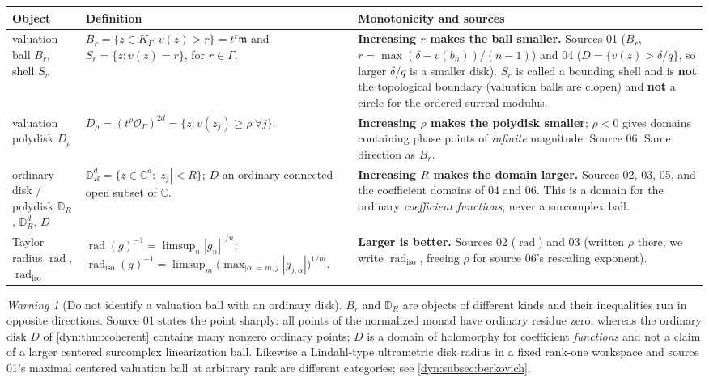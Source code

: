 \documentclass[11pt,letterpaper]{article}
\theoremstyle{definition}
\theoremstyle{remark}
\newtheorem{warning}[warning]{Warning}
\newcommand{\C}{\mathbb C}
\newcommand{\OO}{\mathcal O}
\newcommand{\m}{\mathfrak m}
\newcommand{\rad}{\operatorname{rad}}
\newcommand{\radiso}{\operatorname{rad}_{\mathrm{iso}}}
\numberwithin{equation}{section}
\begin{document}
\begin{longtable}{@{}P{0.16\textwidth}P{0.37\textwidth}P{0.40\textwidth}@{}}
\toprule
Object & Definition & Monotonicity and sources\\
\midrule
\endhead
valuation ball $B_{r}$, shell $S_{r}$
&
$B_{r}=\{z\in K_\Gamma:v(z)>r\}=t^{r}\m$ and
$S_{r}=\{z:v(z)=r\}$, for $r\in\Gamma$.
&
\textbf{Increasing $r$ makes the ball smaller.} Sources 01
($B_{r}$, $r=\max(\delta-v(b_n))/(n-1)$) and 04
($D=\{v(z)>\delta/q\}$, so larger $\delta/q$ is a smaller disk). $S_{r}$
is called a bounding shell and is \textbf{not} the topological boundary
(valuation balls are clopen) and \textbf{not} a circle for the
ordered-surreal modulus.\\[4pt]
valuation polydisk $D_{\rho}$
&
$D_{\rho}=(t^{\rho}\OO_\Gamma)^{2d}=\{z:v(z_j)\ge\rho\ \forall j\}$.
&
\textbf{Increasing $\rho$ makes the polydisk smaller}; $\rho<0$ gives
domains containing phase points of \emph{infinite} magnitude. Source 06.
Same direction as $B_r$.\\[4pt]
ordinary disk / polydisk $\mathbb D_{R}$, $\mathbb D_{R}^{d}$, $D$
&
$\mathbb D_R^{d}=\{z\in\C^{d}:|z_j|<R\}$; $D$ an ordinary connected open
subset of $\C$.
&
\textbf{Increasing $R$ makes the domain larger.} Sources 02, 03, 05, and
the coefficient domains of 04 and 06. This is a domain for the ordinary
\emph{coefficient functions}, never a surcomplex ball.\\[4pt]
Taylor radius $\rad$, $\radiso$
&
$\rad(g)^{-1}=\limsup_n|g_n|^{1/n}$;
$\radiso(g)^{-1}=\limsup_m\bigl(\max_{|\alpha|=m,j}|g_{j,\alpha}|\bigr)^{1/m}$.
&
\textbf{Larger is better.} Sources 02 ($\rad$) and 03 (written $\rho$
there; we write $\radiso$, freeing $\rho$ for source 06's rescaling
exponent).\\
\bottomrule
\end{longtable}

\begin{warning}[Do not identify a valuation ball with an ordinary disk]
\label{dyn:warn:ball}
$B_{r}$ and $\mathbb D_{R}$ are objects of different kinds and their
inequalities run in opposite directions. Source 01 states the point
sharply: all points of the normalized monad have ordinary residue zero,
whereas the ordinary disk $D$ of \cref{dyn:thm:coherent} contains many
nonzero ordinary points; $D$ is a domain of holomorphy for coefficient
\emph{functions} and not a claim of a larger centered surcomplex
linearization ball. Likewise a Lindahl-type ultrametric disk radius in a
fixed rank-one workspace and source 01's maximal centered valuation ball
at arbitrary rank are different categories; see
\cref{dyn:subsec:berkovich}.
\end{warning}
\end{document}
